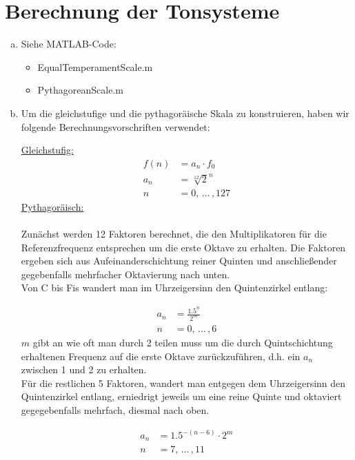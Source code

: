\chapter{Berechnung der Tonsysteme}

\begin{enumerate}[a)]
\item
Siehe MATLAB-Code:
\begin{itemize}
\item
EqualTemperamentScale.m 
\item
PythagoreanScale.m
\end{itemize}
\item
Um die gleichstufige und die pythagoräische Skala zu konstruieren, haben wir folgende Berechnungsvorschriften verwendet:

\underline{Gleichstufig:}
\\
\begin{align*}
    f(n) &= a_n \cdot f_0 \\ 
    a_n &= \sqrt[12]{2}^n \\
    n &= 0, \,... \, ,127
\end{align*} 
\underline{Pythagoräisch:}
\\
\\
Zunächst werden 12 Faktoren berechnet, die den Multiplikatoren für die Referenzfrequenz entsprechen um die erste Oktave zu erhalten.
Die Faktoren ergeben sich aus Aufeinanderschichtung reiner Quinten und anschließender gegebenfalls mehrfacher Oktavierung nach unten.
\\
Von C bis Fis wandert man im Uhrzeigersinn den Quintenzirkel entlang:

\begin{align*}
    a_n &= \frac{1.5^n}{2^m} \\
    n &= 0,  \,... \, ,6
\end{align*} 
$m$ gibt an wie oft man durch 2 teilen muss um die durch Quintschichtung erhaltenen Frequenz auf die erste Oktave zurückzuführen, d.h. ein $a_n$ zwischen 1 und 2 zu erhalten.
\\

Für die restlichen 5 Faktoren, wandert man entgegen dem Uhrzeigersinn den Quintenzirkel entlang, erniedrigt jeweils um eine reine Quinte und oktaviert gegegebenfalls mehrfach, diesmal nach oben.

\begin{align*}
    a_n &= 1.5^{-(n-6)} \cdot 2^m \\
    n &= 7, \, ... \, ,11 
\end{align*}


\end{enumerate}
